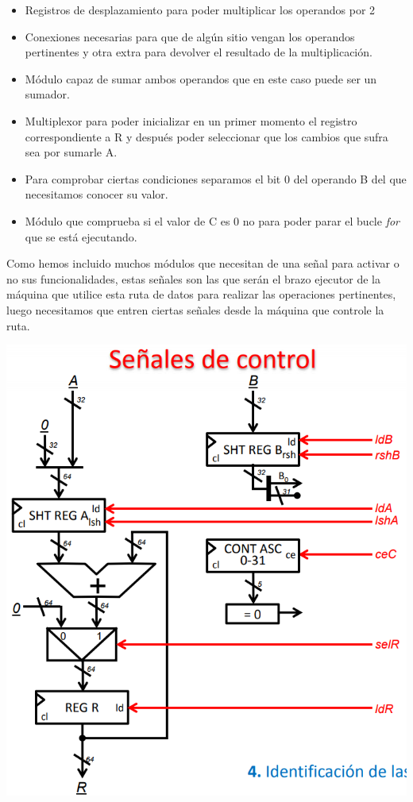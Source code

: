 \documentclass[a4paper,10pt]{book}
\begin{document}
\begin{itemize}
\item Registros de desplazamiento para poder multiplicar los operandos por 2
\item Conexiones necesarias para que de algún sitio vengan los operandos pertinentes y otra extra para devolver el resultado de la multiplicación.
\item Módulo capaz de sumar ambos operandos que en este caso puede ser un sumador.
\item Multiplexor para poder inicializar en un primer momento el registro correspondiente a R y después poder seleccionar que los cambios que sufra sea por sumarle A.
\item Para comprobar ciertas condiciones separamos el bit 0 del operando B del que necesitamos conocer su valor.
\item Módulo que comprueba si el valor de C es 0 no para poder parar el bucle \textit{for} que se está ejecutando.
\end{itemize}
Como hemos incluido muchos módulos que necesitan de una señal para activar o no sus funcionalidades, estas señales son las que serán el brazo ejecutor de la máquina que utilice esta ruta de datos para realizar las operaciones pertinentes, luego necesitamos que entren ciertas señales desde la máquina que controle la ruta.
\begin{center}
\includegraphics[scale=0.5]{ruta de datos7}
\end{center}
\end{document}
